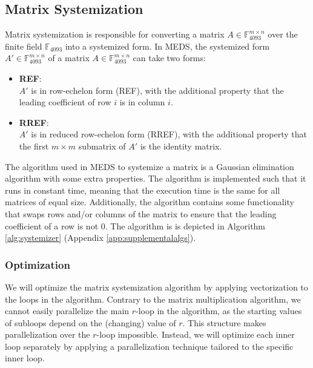 \documentclass[11pt,a4paper]{report}
\theoremstyle{definition}
\begin{document}
\subsection{Matrix Systemization}
\label{sec:matrixsystemization}
Matrix systemization is responsible for converting a matrix $A \in \mathbb{F}_{4093}^{m \times n}$ over the finite field $\mathbb{F}_{4093}$ into a systemized form. In MEDS, the systemized form $A' \in \mathbb{F}_{4093}^{m \times n}$ of a matrix $A \in \mathbb{F}_{4093}^{m \times n}$ can take two forms:
\begin{itemize}
  \item \textbf{REF}:\\
  $A'$ is in row-echelon form (REF), with the additional property that the leading coefficient of row $i$ is in column $i$.
  \item \textbf{RREF}:\\
  $A'$ is in reduced row-echelon form (RREF), with the additional property that the first $m \times m$ submatrix of $A'$ is the identity matrix.
\end{itemize}

The algorithm used in MEDS to systemize a matrix is a Gaussian elimination algorithm with some extra properties. The algorithm is implemented such that it runs in constant time, meaning that the execution time is the same for all matrices of equal size. Additionally, the algorithm contains some functionality that swaps rows and/or columns of the matrix to ensure that the leading coefficient of a row is not 0. The algorithm is is depicted in Algorithm \ref{alg:systemizer} (Appendix \ref{app:supplementalalgs}).

\subsubsection{Optimization}
\label{sec:matrixsystemizationoptimization}
We will optimize the matrix systemization algorithm by applying vectorization to the loops in the algorithm. Contrary to the matrix multiplication algorithm, we cannot easily parallelize the main $r$-loop in the algorithm, as the starting values of subloops depend on the (changing) value of $r$. This structure makes parallelization over the $r$-loop impossible. Instead, we will optimize each inner loop separately by applying a parallelization technique tailored to the specific inner loop.
\end{document}
